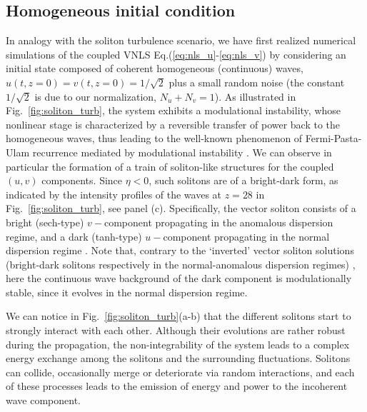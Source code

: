 \documentclass[pra,twocolumn,showpacs,preprintnumbers,amsmath,amssymb]{revtex4}
\begin{document}
\subsection{Homogeneous initial condition}

In  analogy with the soliton turbulence scenario, we have first realized numerical simulations of the coupled VNLS Eq.(\ref{eq:nls_u}-\ref{eq:nls_v}) by considering an initial state composed of coherent homogeneous (continuous) waves, $u(t,z=0)=v(t,z=0)=1/\sqrt{2}$ plus a small random noise (the constant $1/\sqrt{2}$ is due to our normalization, $N_u+N_v=1$).
As illustrated in Fig.~\ref{fig:soliton_turb}, the system exhibits a modulational instability, whose nonlinear stage is characterized by a reversible transfer of power back to the homogeneous waves, thus leading to the well-known phenomenon of Fermi-Pasta-Ulam recurrence mediated by modulational instability   \cite{kuznetsov,kruskal,akhmediev86,fpu_review,onorato_fpu,
haelterman,mussotPR14,erkintalo11,
wabnitz_pla14,kibler15}.
We can observe in particular the formation of a train of soliton-like structures for the coupled $(u,v)$ components.
Since $\eta < 0$, such solitons are of a bright-dark form, as indicated by the intensity profiles of the waves at $z=28$ in Fig.~\ref{fig:soliton_turb}, see panel (c).
Specifically, the vector soliton consists of a bright (sech-type) $v-$component propagating in the anomalous dispersion regime, and a dark (tanh-type) $u-$component propagating in the normal dispersion regime \cite{Kivshar_PLA}. 
Note that, contrary to the `inverted' vector soliton solutions (bright-dark solitons respectively in the normal-anomalous dispersion regimes) \cite{trillo88,lisak90,kivshar91}, here the continuous wave background of the dark component is modulationally stable, since it evolves in the normal dispersion regime. 

We can notice in Fig.~\ref{fig:soliton_turb}(a-b) that the different solitons start to strongly interact with each other.
Although their evolutions are rather robust during the propagation, the non-integrability of the system leads to a complex energy exchange among the solitons and the surrounding fluctuations. 
Solitons can collide, occasionally merge or deteriorate via random interactions, and each of these processes leads to the emission of energy and power to the incoherent wave component. 
\end{document}
